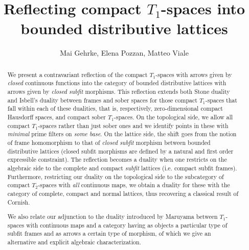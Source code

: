 \documentclass{article}
\title{Reflecting compact $T_1$-spaces into bounded distributive lattices}
\author{Mai Gehrke, Elena Pozzan, Matteo Viale}
\theoremstyle{plain}
\theoremstyle{definition}
\theoremstyle{remark}
\newcommand{\bool}[1]{\mathsf{#1}}
\newcommand{\0}{\mathbbm 0}
\newcommand{\1}{\mathbbm 1}
\newcommand{\2}{\mathbbm 2}
\begin{document}
\maketitle

\begin{abstract}
We present a contravariant reflection of the compact $T_1$-spaces with arrows given by \emph{closed} continuous functions into the category of bounded distributive lattices with arrows given by \emph{closed subfit} morphisms. This reflection extends both Stone duality and Isbell's duality between frames and sober spaces for those compact $T_1$-spaces that fall within each of these dualities, that is, respectively, zero-dimensional compact Hausdorff spaces, and compact sober $T_1$-spaces. 
On the topological side, we allow all compact $T_1$-spaces rather than just sober ones and we identify points in these with \emph{minimal} prime filters on \emph{some base}. %
On the lattice side, the shift goes from the notion of frame homomorphism to that of \emph{closed subfit} morphism between bounded distributive lattices (closed subfit morphisms are defined by a natural and first order expressible constraint).
%
The reflection becomes a duality when one restricts on the algebraic side to the complete and compact \emph{subfit} lattices (i.e. compact subfit frames). 
Furthermore, restricting our duality on the topological side to the subcategory of compact $T_2$-spaces with \emph{all} continuous maps, 
we obtain a duality for these with the category of complete, compact and normal lattices, thus recovering a classical result of Cornish. 

We also relate our adjunction to the duality introduced by Maruyama between $T_1$-spaces with continuous maps and a category having as objects a particular type of subfit frames and as arrows a certain type of morphism, of which we give an alternative and explicit 
algebraic characterization. 
\end{abstract}
\end{document}
